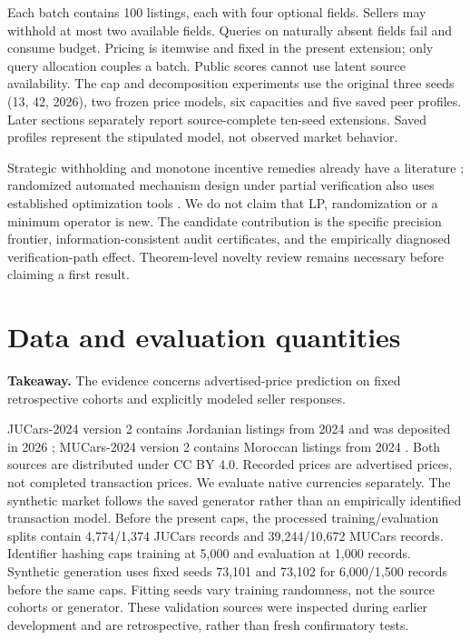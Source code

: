 \documentclass[11pt]{article}
\begin{document}
Each batch contains 100 listings, each with four optional fields. Sellers may
withhold at most two available fields. Queries on naturally absent fields fail
and consume budget. Pricing is itemwise and fixed in the present extension;
only query allocation couples a batch. Public scores cannot use latent source
availability. The cap and decomposition experiments use the original three seeds
(13, 42, 2026), two frozen price models, six capacities and five saved peer
profiles. Later sections separately report source-complete ten-seed extensions.
Saved profiles represent the stipulated model, not observed market behavior.

Strategic withholding and monotone incentive remedies already have a literature
\cite{withheld}; randomized automated mechanism design under partial verification
also uses established optimization tools \cite{partial}. We do not claim that LP,
randomization or a minimum operator is new. The candidate contribution is the
specific precision frontier, information-consistent audit certificates, and the
empirically diagnosed verification-path effect. Theorem-level novelty review remains
necessary before claiming a first result.

\section{Data and evaluation quantities}
\noindent\textbf{Takeaway.} The evidence concerns advertised-price prediction
on fixed retrospective cohorts and explicitly modeled seller responses.

JUCars-2024 version 2 contains Jordanian listings from 2024 and was deposited
in 2026 \cite{jucarsdata}; MUCars-2024 version 2 contains Moroccan listings
from 2024 \cite{mucarsdata}. Both sources are distributed under CC BY 4.0.
Recorded prices are advertised prices, not completed transaction prices.
We evaluate native currencies separately. The synthetic market follows the
saved generator rather than an empirically identified transaction model.
Before the present caps, the processed training/evaluation splits contain
4,774/1,374 JUCars records and 39,244/10,672 MUCars records. Identifier hashing
caps training at 5,000 and evaluation at 1,000 records. Synthetic generation
uses fixed seeds 73,101 and 73,102 for 6,000/1,500 records before the same caps.
Fitting seeds vary training randomness, not the source cohorts or generator.
These validation sources were inspected during earlier development and are
retrospective, rather than fresh confirmatory tests.
\end{document}
